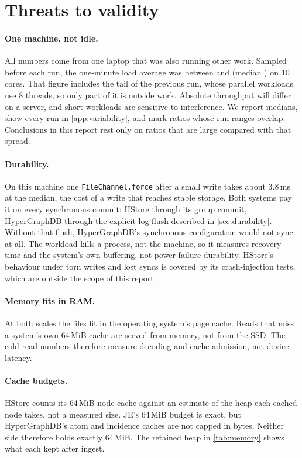 \section{Threats to validity}
\label{sec:validity}

\paragraph{One machine, not idle.} All numbers come from one laptop that was also running other work. Sampled before each run, the one-minute load average was between  and  (median ) on 10 cores. That figure includes the tail of the previous run, whose parallel workloads use 8 threads, so only part of it is outside work. Absolute throughput will differ on a server, and short workloads are sensitive to interference. We report medians, show every run in \cref{app:variability}, and mark ratios whose run ranges overlap. Conclusions in this report rest only on ratios that are large compared with that spread.

\paragraph{Durability.} On this machine one \texttt{FileChannel.force} after a small write takes about 3.8\,ms at the median, the cost of a write that reaches stable storage. Both systems pay it on every synchronous commit: HStore through its group commit, HyperGraphDB through the explicit log flush described in \cref{sec:durability}. Without that flush, HyperGraphDB's synchronous configuration would not sync at all. The  workload kills a process, not the machine, so it measures recovery time and the system's own buffering, not power-failure durability. HStore's behaviour under torn writes and lost syncs is covered by its crash-injection tests, which are outside the scope of this report.

\paragraph{Memory fits in RAM.} At both scales the files fit in the operating system's page cache. Reads that miss a system's own 64\,MiB cache are served from memory, not from the SSD. The cold-read numbers therefore measure decoding and cache admission, not device latency.

\paragraph{Cache budgets.} HStore counts its 64\,MiB node cache against an estimate of the heap each cached node takes, not a measured size. JE's 64\,MiB budget is exact, but HyperGraphDB's atom and incidence caches are not capped in bytes. Neither side therefore holds exactly 64\,MiB. The retained heap in \cref{tab:memory} shows what each kept after ingest.

